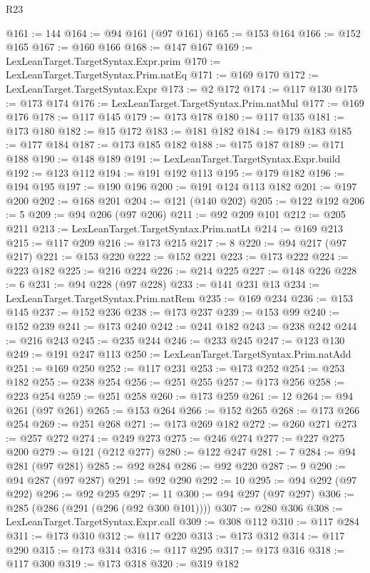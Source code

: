 \begin{lexlean}{R23}
\begin{coremodule}
@161 := 144
@164 := @94 @161 (@97 @161)
@165 := @153 @164
@166 := @152 @165
@167 := @160 @166
@168 := @147 @167
@169 := LexLeanTarget.TargetSyntax.Expr.prim
@170 := LexLeanTarget.TargetSyntax.Prim.natEq
@171 := @169 @170
@172 := LexLeanTarget.TargetSyntax.Expr
@173 := @2 @172
@174 := @117 @130
@175 := @173 @174
@176 := LexLeanTarget.TargetSyntax.Prim.natMul
@177 := @169 @176
@178 := @117 @145
@179 := @173 @178
@180 := @117 @135
@181 := @173 @180
@182 := @15 @172
@183 := @181 @182
@184 := @179 @183
@185 := @177 @184
@187 := @173 @185 @182
@188 := @175 @187
@189 := @171 @188
@190 := @148 @189
@191 := LexLeanTarget.TargetSyntax.Expr.build
@192 := @123 @112
@194 := @191 @192 @113
@195 := @179 @182
@196 := @194 @195
@197 := @190 @196
@200 := @191 @124 @113 @182
@201 := @197 @200
@202 := @168 @201
@204 := @121 (@140 @202)
@205 := @122 @192
@206 := 5
@209 := @94 @206 (@97 @206)
@211 := @92 @209 @101
@212 := @205 @211
@213 := LexLeanTarget.TargetSyntax.Prim.natLt
@214 := @169 @213
@215 := @117 @209
@216 := @173 @215
@217 := 8
@220 := @94 @217 (@97 @217)
@221 := @153 @220
@222 := @152 @221
@223 := @173 @222
@224 := @223 @182
@225 := @216 @224
@226 := @214 @225
@227 := @148 @226
@228 := 6
@231 := @94 @228 (@97 @228)
@233 := @141 @231 @13
@234 := LexLeanTarget.TargetSyntax.Prim.natRem
@235 := @169 @234
@236 := @153 @145
@237 := @152 @236
@238 := @173 @237
@239 := @153 @99
@240 := @152 @239
@241 := @173 @240
@242 := @241 @182
@243 := @238 @242
@244 := @216 @243
@245 := @235 @244
@246 := @233 @245
@247 := @123 @130
@249 := @191 @247 @113
@250 := LexLeanTarget.TargetSyntax.Prim.natAdd
@251 := @169 @250
@252 := @117 @231
@253 := @173 @252
@254 := @253 @182
@255 := @238 @254
@256 := @251 @255
@257 := @173 @256
@258 := @223 @254
@259 := @251 @258
@260 := @173 @259
@261 := 12
@264 := @94 @261 (@97 @261)
@265 := @153 @264
@266 := @152 @265
@268 := @173 @266 @254
@269 := @251 @268
@271 := @173 @269 @182
@272 := @260 @271
@273 := @257 @272
@274 := @249 @273
@275 := @246 @274
@277 := @227 @275 @200
@279 := @121 (@212 @277)
@280 := @122 @247
@281 := 7
@284 := @94 @281 (@97 @281)
@285 := @92 @284
@286 := @92 @220
@287 := 9
@290 := @94 @287 (@97 @287)
@291 := @92 @290
@292 := 10
@295 := @94 @292 (@97 @292)
@296 := @92 @295
@297 := 11
@300 := @94 @297 (@97 @297)
@306 := @285 (@286 (@291 (@296 (@92 @300 @101))))
@307 := @280 @306
@308 := LexLeanTarget.TargetSyntax.Expr.call
@309 := @308 @112
@310 := @117 @284
@311 := @173 @310
@312 := @117 @220
@313 := @173 @312
@314 := @117 @290
@315 := @173 @314
@316 := @117 @295
@317 := @173 @316
@318 := @117 @300
@319 := @173 @318
@320 := @319 @182

\end{coremodule}
\end{lexlean}
